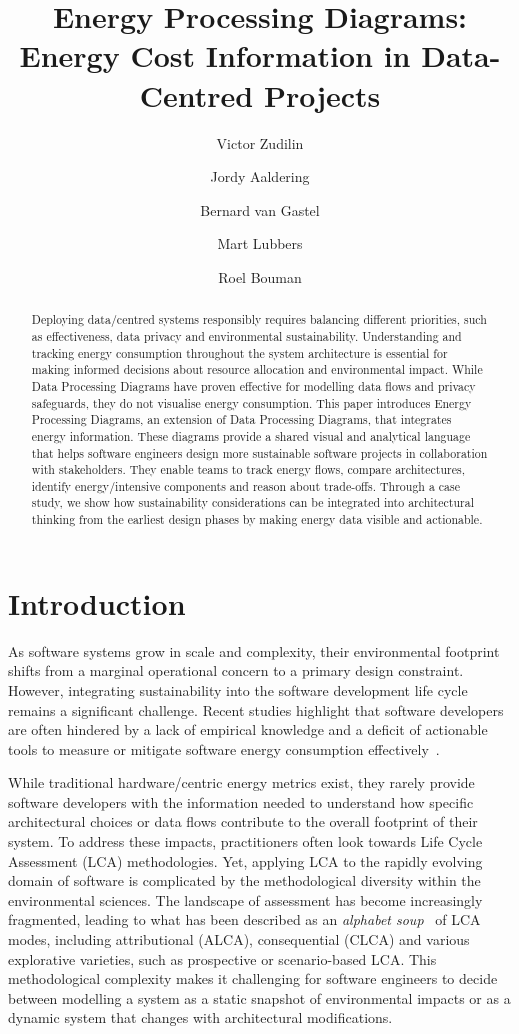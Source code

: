 \documentclass[11pt,a4paper]{article}
\title{Energy Processing Diagrams: Energy Cost Information in Data-Centred Projects}
\author{Victor Zudilin \and Jordy Aaldering \and Bernard {van Gastel} \and Mart Lubbers \and Roel Bouman}
\date{}
\begin{document}
\maketitle

\begin{abstract}
Deploying data\-/centred systems responsibly requires balancing different priorities, such as effectiveness, data privacy and environmental sustainability.
Understanding and tracking energy consumption throughout the system architecture is essential for making informed decisions about resource allocation and environmental impact.
While Data Processing Diagrams have proven effective for modelling data flows and privacy safeguards, they do not visualise energy consumption.
This paper introduces Energy Processing Diagrams, an extension of Data Processing Diagrams, that integrates energy information.
These diagrams provide a shared visual and analytical language that helps software engineers design more sustainable software projects in collaboration with stakeholders.
They enable teams to track energy flows, compare architectures, identify energy\-/intensive components and reason about trade-offs.
Through a case study, we show how sustainability considerations can be integrated into architectural thinking from the earliest design phases by making energy data visible and actionable.
\end{abstract}

\section{Introduction}
As software systems grow in scale and complexity, their environmental footprint shifts from a marginal operational concern to a primary design constraint.
However, integrating sustainability into the software development life cycle remains a significant challenge.
Recent studies highlight that software developers are often hindered by a lack of empirical knowledge and a deficit of actionable tools to measure or mitigate software energy consumption effectively~\cite{pinto2017energy}.

While traditional hardware\-/centric energy metrics exist, they rarely provide software developers with the information needed to understand how specific architectural choices or data flows contribute to the overall footprint of their system.
To address these impacts, practitioners often look towards Life Cycle Assessment (LCA) methodologies.
Yet, applying LCA to the rapidly evolving domain of software is complicated by the methodological diversity within the environmental sciences.
The landscape of assessment has become increasingly fragmented, leading to what has been described as an \emph{alphabet soup}~\cite{guinee2018digesting} of LCA modes, including attributional (ALCA), consequential (CLCA) and various explorative varieties, such as prospective or scenario-based LCA.
This methodological complexity makes it challenging for software engineers to decide between modelling a system as a static snapshot of environmental impacts or as a dynamic system that changes with architectural modifications.
\end{document}
